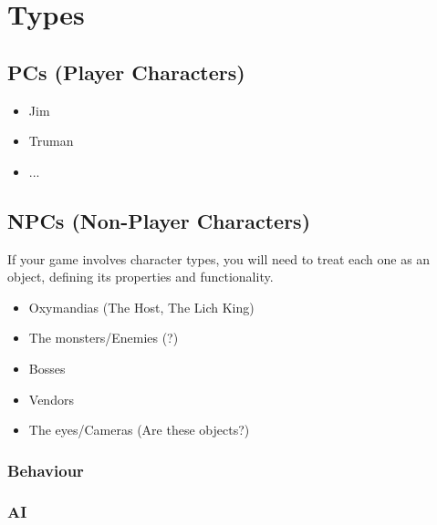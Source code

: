 \section{Types} %

\subsection{PCs (Player Characters)} %

\begin{itemize} %
    \item Jim
    \item Truman
    \item ...
\end{itemize}

\subsection{NPCs (Non-Player Characters)} %

If your game involves character types, you will need to treat each one as an
object, defining its properties and functionality.

\begin{itemize}
    \item Oxymandias (The Host, The Lich King)
    \item The monsters/Enemies (?)
    \item Bosses
    \item Vendors
    \item The eyes/Cameras (Are these objects?)
\end{itemize}

\subsubsection{Behaviour} %

\subsubsection{AI} %
